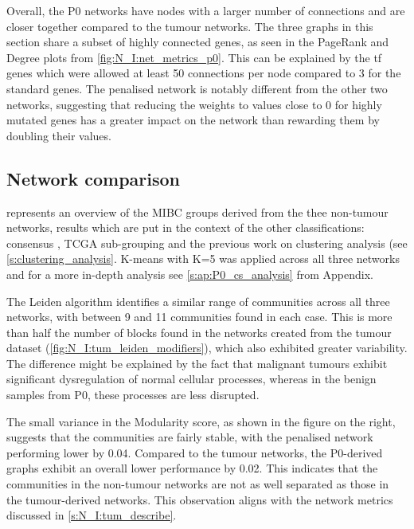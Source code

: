 Overall, the P0 networks have nodes with a larger number of connections and are closer together compared to the tumour networks. The three graphs in this section share a subset of highly connected genes, as seen in the PageRank and Degree plots from \cref{fig:N_I:net_metrics_p0}. This can be explained by the \acrfull{tf} genes which were allowed at least 50 connections per node compared to 3 for the standard genes. The penalised network is notably different from the other two networks, suggesting that reducing the weights to values close to 0 for highly mutated genes has a greater impact on the network than rewarding them by doubling their values.


\subsection{Network comparison}

 represents an overview of the MIBC groups derived from the thee non-tumour networks, results which are put in the context of the other classifications: consensus \citep{Kamoun2020-tj}, TCGA sub-grouping \citep{Robertson2017-mg} and the previous work on clustering analysis (see \cref{s:clustering_analysis}. K-means with K=5 was applied across all three networks and for a more in-depth analysis see \cref{s:ap:P0_cs_analysis} from Appendix.

The Leiden algorithm identifies a similar range of communities across all three networks, with between 9 and 11 communities found in each case. This is more than half the number of blocks found in the networks created from the tumour dataset (\cref{fig:N_I:tum_leiden_modifiers}), which also exhibited greater variability. The difference might be explained by the fact that malignant tumours exhibit significant dysregulation of normal cellular processes, whereas in the benign samples from P0, these processes are less disrupted.

The small variance in the Modularity score, as shown in the figure on the right, suggests that the communities are fairly stable, with the penalised network performing lower by 0.04. Compared to the tumour networks, the P0-derived graphs exhibit an overall lower performance by 0.02. This indicates that the communities in the non-tumour networks are not as well separated as those in the tumour-derived networks. This observation aligns with the network metrics discussed in \cref{s:N_I:tum_describe}.

